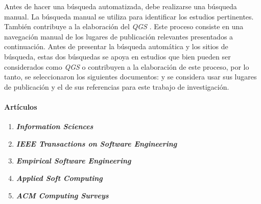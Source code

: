 Antes de hacer una búsqueda automatizada, debe realizarse una búsqueda manual. La búsqueda manual se utiliza para identificar los estudios pertinentes. También contribuye a la elaboración del \textit{QGS} \cite{Zhang2011}. Este proceso consiste en una navegación manual de los lugares de publicación relevantes presentados a continuación.
Antes de presentar la búsqueda automática y los sitios de búsqueda, estas dos búsquedas se apoya en estudios que bien pueden ser considerados como \textit{QGS} o contribuyen a la elaboración de este proceso, por lo tanto, se seleccionaron los siguientes  documentos: \cite{Wang2014, Santos2015, Salinesi2009a, Souag2015, Farias2016, Soares2014, Sepulveda2016, Eleuterio2015, Bakar2015a}  y se considera usar sus lugares de publicación y el de sus referencias para este trabajo de investigación.  

\paragraph{Artículos}

\begin{enumerate}

\item \textbf{\textit{Information Sciences}}
\item \textbf{\textit{IEEE Transactions on Software Engineering}}
\item \textbf{\textit{Empirical Software Engineering}}
\item \textbf{\textit{Applied Soft Computing}}
\item \textbf{\textit{ACM Computing Surveys}}
\end{enumerate}
